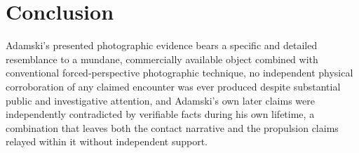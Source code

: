 \documentclass[11pt]{article}
\begin{document}
\section{Conclusion}

Adamski's presented photographic evidence bears a specific and detailed resemblance to a mundane, commercially available object combined with conventional forced-perspective photographic technique, no independent physical corroboration of any claimed encounter was ever produced despite substantial public and investigative attention, and Adamski's own later claims were independently contradicted by verifiable facts during his own lifetime, a combination that leaves both the contact narrative and the propulsion claims relayed within it without independent support.
\end{document}
